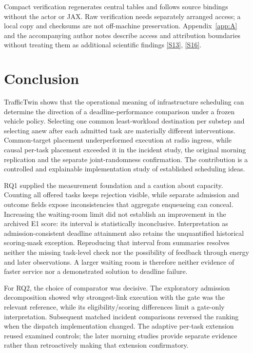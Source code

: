 \documentclass[11pt,a4paper]{article}
\begin{document}
Compact verification regenerates central tables and follows source bindings without the actor or JAX. Raw verification needs separately arranged access; a local copy and checksums are not off-machine preservation. Appendix~\ref{app:A} and the accompanying author notes describe access and attribution boundaries without treating them as additional scientific findings \hyperref[source-s13]{[S13]}, \hyperref[source-s16]{[S16]}.

\section{Conclusion}\label{sec:4}

TrafficTwin shows that the operational meaning of infrastructure scheduling can determine the direction of a deadline-performance comparison under a frozen vehicle policy. Selecting one common least-workload destination per substep and selecting anew after each admitted task are materially different interventions. Common-target placement underperformed execution at radio ingress, while causal per-task placement exceeded it in the incident study, the original morning replication and the separate joint-randomness confirmation. The contribution is a controlled and explainable implementation study of established scheduling ideas.

RQ1 supplied the measurement foundation and a caution about capacity. Counting all offered tasks keeps rejection visible, while separate admission and outcome fields expose inconsistencies that aggregate enqueueing can conceal. Increasing the waiting-room limit did not establish an improvement in the archived E1 score: its interval is statistically inconclusive. Interpretation as admission-consistent deadline attainment also retains the unquantified historical scoring-mask exception. Reproducing that interval from summaries resolves neither the missing task-level check nor the possibility of feedback through energy and later observations. A larger waiting room is therefore neither evidence of faster service nor a demonstrated solution to deadline failure.

For RQ2, the choice of comparator was decisive. The exploratory admission decomposition showed why strongest-link execution with the gate was the relevant reference, while its eligibility/scoring differences limit a gate-only interpretation. Subsequent matched incident comparisons reversed the ranking when the dispatch implementation changed. The adaptive per-task extension reused examined controls; the later morning studies provide separate evidence rather than retroactively making that extension confirmatory.
\end{document}
